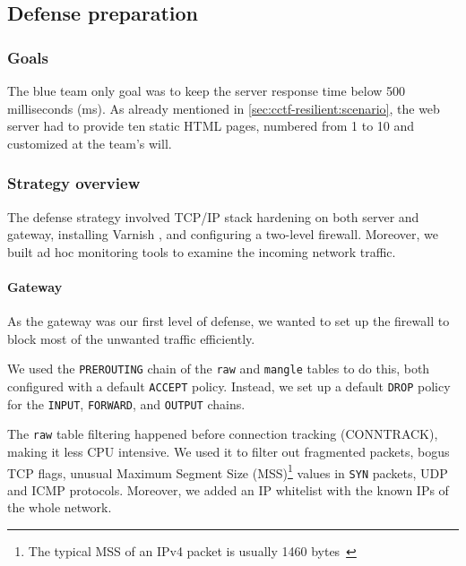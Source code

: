 \subsection{Defense preparation}
\label{sec:cctf-resilient:def-prep}

\subsubsection{Goals}
\label{sec:cctf-resilient:def-prep:goals}

The blue team only goal was to keep the server response time below 500 milliseconds (ms).
As already mentioned in \autoref{sec:cctf-resilient:scenario}, the web server had to provide ten static HTML pages, numbered from 1 to 10 and customized at the team's will. 

\subsubsection{Strategy overview}
\label{sec:cctf-resilient:def-prep:strat-out}

The defense strategy involved TCP/IP stack hardening on both server and gateway, installing Varnish \cite{varnish}, and configuring a two-level firewall.
Moreover, we built ad hoc monitoring tools to examine the incoming network traffic.

\paragraph{Gateway}
\label{sec:cctf-resilient:def-prep:gateway}

As the gateway was our first level of defense, we wanted to set up the firewall to block most of the unwanted traffic efficiently.

We used the \texttt{PREROUTING} chain of the \texttt{raw} and \texttt{mangle} tables to do this, both configured with a default \texttt{ACCEPT} policy. Instead, we set up a default \texttt{DROP} policy for the \texttt{INPUT}, \texttt{FORWARD}, and \texttt{OUTPUT} chains.

The \texttt{raw} table filtering happened before connection tracking (CONNTRACK), making it less CPU intensive.
We used it to filter out fragmented packets, bogus TCP flags, unusual Maximum Segment Size (MSS)\footnote{The typical MSS of an IPv4 packet is usually 1460 bytes~\cite{kurose-ross}} values in \texttt{SYN} packets, UDP and ICMP protocols. Moreover, we added an IP whitelist with the known IPs of the whole network.

